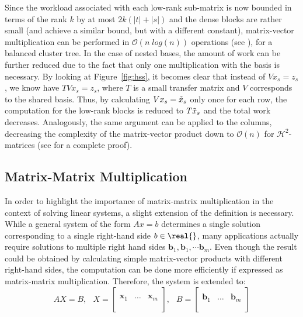 \noindent Since the workload associated with each low-rank sub-matrix is now bounded in terms of the rank $k$ by at most $2k(|t|+|s|)$ and the dense blocks are rather small (and achieve a similar bound, but with a different constant), matrix-vector multiplication can be performed in $\mathcal{O}(n\;log(n))$ operations (see \cite{bebendorf_hierarchical_2008}), for a balanced cluster tree. In the case of nested bases, the amount of work can be further reduced due to the fact that only one multiplication with the basis is necessary. By looking at Figure~\hyperref[fig:hss]{\ref{fig:hss}}, it becomes clear that instead of $Vx_s = z_s$, we know have $TVx_s = z_s$, where $T$ is a small transfer matrix and $V$ corresponds to the shared basis. Thus, by calculating $Vx_s = \Tilde{x}_s$ only once for each row, the computation for the low-rank blocks is reduced to $T\Tilde{x}_s$ and the total work decreases. Analogously, the same argument can be applied to the columns, decreasing the complexity of the matrix-vector product down to $\mathcal{O}(n)$ for $\mathcal{H}^2$-matrices (see \cite{hackbusch_hierarchical_2015} for a complete proof).

\subsection{Matrix-Matrix Multiplication}
\label{sec:matrix_matrix}

In order to highlight the importance of matrix-matrix multiplication in the context of solving linear systems, a slight extension of the definition is necessary. While a general system of the form $Ax=b$ determines a single solution corresponding to a single right-hand side $b \in \real{}$, many applications actually require solutions to multiple right hand sides $\bm{b}_1, \bm{b}_1, \cdots \bm{b}_m $. Even though the result could be obtained by calculating simple matrix-vector products with different right-hand sides, the computation can be done more efficiently if expressed as matrix-matrix multiplication. Therefore, the system is extended to:
\begin{equation}
    AX=B\text{, } \;\; X=
    \left[
    \begin{array}{c|c|c}
      & & \\
      \bm{x}_1 &\dots & \bm{x}_m \\
      & & \\
    \end{array}
  \right]\text{, } \;\;B=
    \left[
    \begin{array}{c|c|c}
      & & \\
      \bm{b}_1 &\dots & \bm{b}_m \\
      & & \\
    \end{array}
  \right] 
\end{equation}

